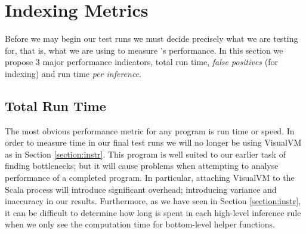 \section{Indexing Metrics}
\label{sec:metrics}

Before we may begin our test runs we must decide precisely what we are testing for, that is,
what we are using to measure \beagle's performance. In this section
we propose 3 major performance indicators, total run time, \emph{false positives} (for indexing)
and run time \emph{per inference}.

\subsection{Total Run Time}
\label{sec:runtime}

The most obvious performance metric for any program is run time or speed.
In order to measure time in our final test runs 
we will no longer be using VisualVM as in Section \ref{section:instr}. This program is well suited to our earlier task
of finding bottlenecks; but it will cause problems when attempting to analyse performance of a completed program.
In particular, attaching VisualVM to the Scala process will introduce significant overhead;
introducing variance and inaccuracy in our results. Furthermore, as we have seen in Section \ref{section:instr},
it can be difficult to determine how long is spent in each high-level inference rule
when we only see the computation time for bottom-level helper functions.

